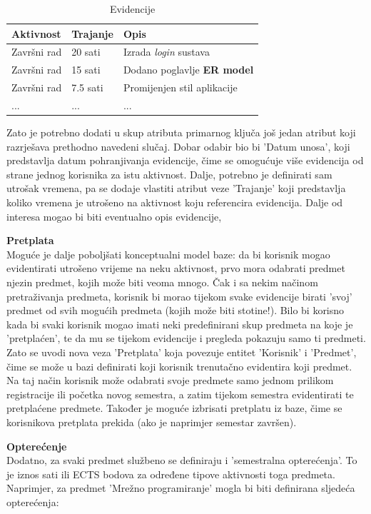 \documentclass[times, utf8, zavrsni]{fer}
\begin{document}
\begin{table}[H]
\caption{Evidencije}
\label{tbl:talica-evidencija}
\centering
\begin{tabular}{lll} \hline
Aktivnost & Trajanje & Opis\\ \hline
Završni rad & 20 sati & Izrada \emph{login} sustava\\ 
Završni rad & 15 sati & Dodano poglavlje \textbf{ER model}\\
Završni rad & 7.5 sati & Promijenjen stil aplikacije\\
... & ... & ...\\
\end{tabular}
\end{table}

Zato je potrebno dodati u skup atributa primarnog ključa još jedan atribut koji razrješava prethodno navedeni slučaj. Dobar odabir bio bi 'Datum unosa', koji predstavlja datum pohranjivanja evidencije, čime se omogućuje više evidencija od strane jednog korisnika za istu aktivnost. Dalje, potrebno je definirati sam utrošak vremena, pa se dodaje vlastiti atribut veze 'Trajanje' koji predstavlja koliko vremena je utrošeno na aktivnost koju referencira evidencija. Dalje od interesa mogao bi biti eventualno opis evidencije, 

\textbf{Pretplata}\\
Moguće je dalje poboljšati konceptualni model baze: da bi korisnik mogao evidentirati utrošeno vrijeme na neku aktivnost, prvo mora odabrati predmet njezin predmet, kojih može biti veoma mnogo. Čak i sa nekim načinom pretraživanja predmeta, korisnik bi morao tijekom svake evidencije birati 'svoj' predmet od svih mogućih predmeta (kojih može biti stotine!). Bilo bi korisno kada bi svaki korisnik mogao imati neki predefinirani skup predmeta na koje je 'pretplaćen', te da mu se tijekom evidencije i pregleda pokazuju samo ti predmeti. Zato se uvodi nova veza 'Pretplata' koja povezuje entitet 'Korisnik' i 'Predmet', čime se može u bazi definirati koji korisnik trenutačno evidentira koji predmet. Na taj način korisnik može odabrati svoje predmete samo jednom prilikom registracije ili početka novog semestra, a zatim tijekom semestra evidentirati te pretplaćene predmete. Također je moguće izbrisati pretplatu iz baze, čime se korisnikova pretplata prekida (ako je naprimjer semestar završen).

\textbf{Opterećenje}\\
Dodatno, za svaki predmet službeno se definiraju i 'semestralna opterećenja'. To je iznos sati ili ECTS bodova za određene tipove aktivnosti toga predmeta. Naprimjer, za predmet 'Mrežno programiranje' mogla bi biti definirana sljedeća opterećenja:
\end{document}
